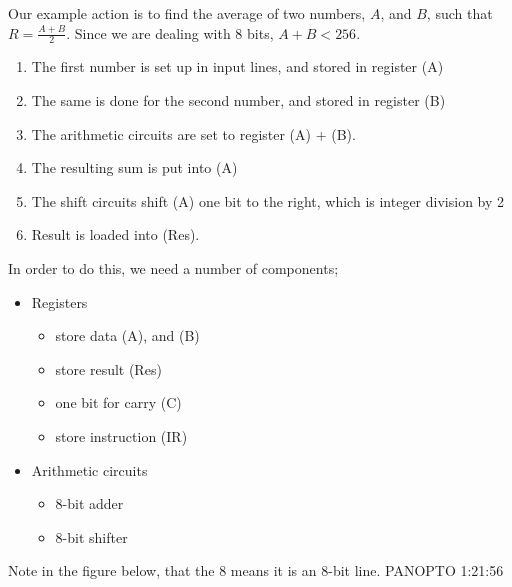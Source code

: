 \documentclass[a4paper, 12pt]{article}
\begin{document}
            Our example action is to find the average of two numbers, $A$, and $B$, such that $R = \frac{A + B}{2}$. Since we are dealing with 8 bits, $A + B < 256$.
            \begin{enumerate}[1.]
                \itemsep0em
                \item The first number is set up in input lines, and stored in register (A)
                \item The same is done for the second number, and stored in register (B)
                \item The arithmetic circuits are set to register (A) + (B).
                \item The resulting sum is put into (A)
                \item The shift circuits shift (A) one bit to the right, which is integer division by 2
                \item Result is loaded into (Res).
            \end{enumerate}
            In order to do this, we need a number of components;
            \begin{itemize}
                \itemsep0em
                \item Registers
                    \begin{itemize}
                        \itemsep0em
                        \item store data (A), and (B)
                        \item store result (Res)
                        \item one bit for carry (C)
                        \item store instruction (IR)
                    \end{itemize}
                \item Arithmetic circuits
                    \begin{itemize}
                        \itemsep0em
                        \item 8-bit adder
                        \item 8-bit shifter
                    \end{itemize}
            \end{itemize}
            Note in the figure below, that the 8 means it is an 8-bit line.
            PANOPTO 1:21:56
            \medskip
\end{document}
